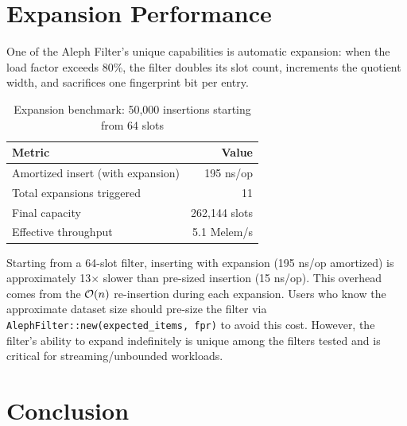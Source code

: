   \section{Expansion Performance}

  One of the Aleph Filter's unique capabilities is automatic expansion: when the
  load factor exceeds 80\%, the filter doubles its slot count, increments the
  quotient width, and sacrifices one fingerprint bit per entry.

  \begin{table}[H]
    \centering
    \caption{Expansion benchmark: 50{,}000 insertions starting from 64 slots}
    \label{tab:expansion}
    \begin{tabular}{l r}
      \hline
      \textbf{Metric} & \textbf{Value} \\
      \hline
      Amortized insert (with expansion) & 195 ns/op \\
      Total expansions triggered        & 11 \\
      Final capacity                    & 262{,}144 slots \\
      Effective throughput              & 5.1 Melem/s \\
      \hline
    \end{tabular}
  \end{table}

  \begin{warningbox}
    Starting from a 64-slot filter, inserting with expansion (195 ns/op amortized)
    is approximately 13$\times$ slower than pre-sized insertion (15 ns/op). This overhead comes from
    the $\mathcal{O}(n)$ re-insertion during each expansion. Users who know the approximate
    dataset size should pre-size the filter via \texttt{AlephFilter::new(expected\_items, fpr)}
    to avoid this cost. However, the filter's ability to expand indefinitely is unique
    among the filters tested and is critical for streaming/unbounded workloads.
  \end{warningbox}


  \section{Conclusion}

